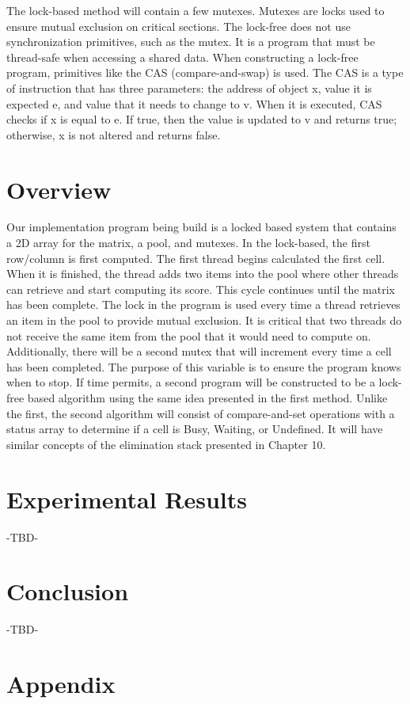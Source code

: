 \documentclass[letterpaper, 10 pt, conference]{IEEEconf}
\begin{document}
The lock-based method will contain a few mutexes. Mutexes are locks used to ensure mutual exclusion on critical sections. The lock-free does not use synchronization primitives, such as the mutex. It is a program that must be thread-safe when accessing a shared data. When constructing a lock-free program, primitives like the CAS (compare-and-swap) is used. The CAS is a type of instruction that has three parameters: the address of object x, value it is expected e, and value that it needs to change to v. When it is executed, CAS checks if x is equal to e. If true, then the value is updated to v and returns true; otherwise, x is not altered and returns false. 

\section{Overview}
Our implementation program being build is a locked based system that contains a 2D array for the matrix, a pool, and mutexes. In the lock-based, the first row/column is first computed. The first thread begins calculated the first cell. When it is finished, the thread adds two items into the pool where other threads can retrieve and start computing its score. This cycle continues until the matrix has been complete.
The lock in the program is used every time a thread retrieves an item in the pool to provide mutual exclusion. It is critical that two threads do not receive the same item from the pool that it would need to compute on. Additionally, there will be a second mutex that will increment every time a cell has been completed. The purpose of this variable is to ensure the program knows when to stop.
If time permits, a second program will be constructed to be a lock-free based algorithm using the same idea presented in the first method. Unlike the first, the second algorithm will consist of compare-and-set operations with a status array to determine if a cell is Busy, Waiting, or Undefined. It will have similar concepts of the elimination stack presented in Chapter 10. 

\section{Experimental Results}
-TBD-

\section{Conclusion}
-TBD-

\section{Appendix}
\end{document}
